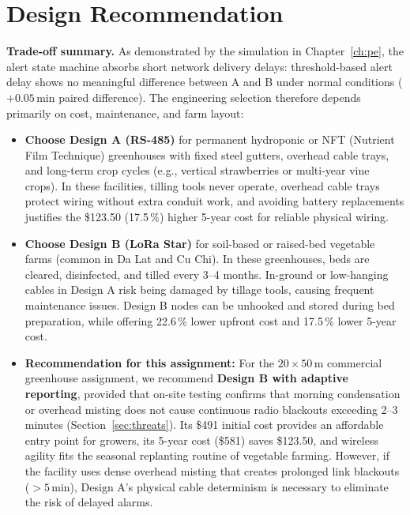 \documentclass[11pt,a4paper]{report}
\begin{document}
\section{Design Recommendation}\label{sec:rec}
\textbf{Trade-off summary.} As demonstrated by the simulation in Chapter~\ref{ch:pe}, the alert state machine absorbs short network delivery delays: threshold-based alert delay shows no meaningful difference between A and B under normal conditions ($+0.05$\,min paired difference). The engineering selection therefore depends primarily on cost, maintenance, and farm layout:
\begin{itemize}
  \item \textbf{Choose Design A (RS-485)} for permanent hydroponic or NFT (Nutrient Film Technique) greenhouses with fixed steel gutters, overhead cable trays, and long-term crop cycles (e.g., vertical strawberries or multi-year vine crops). In these facilities, tilling tools never operate, overhead cable trays protect wiring without extra conduit work, and avoiding battery replacements justifies the \$123.50 (17.5\,\%) higher 5-year cost for reliable physical wiring.
  \item \textbf{Choose Design B (LoRa Star)} for soil-based or raised-bed vegetable farms (common in Da Lat and Cu Chi). In these greenhouses, beds are cleared, disinfected, and tilled every 3--4 months. In-ground or low-hanging cables in Design A risk being damaged by tillage tools, causing frequent maintenance issues. Design B nodes can be unhooked and stored during bed preparation, while offering 22.6\,\% lower upfront cost and 17.5\,\% lower 5-year cost.
  \item \textbf{Recommendation for this assignment:} For the $20\times50$\,m commercial greenhouse assignment, we recommend \textbf{Design B with adaptive reporting}, provided that on-site testing confirms that morning condensation or overhead misting does not cause continuous radio blackouts exceeding 2--3 minutes (Section~\ref{sec:threats}). Its \$491 initial cost provides an affordable entry point for growers, its 5-year cost (\$581) saves \$123.50, and wireless agility fits the seasonal replanting routine of vegetable farming. However, if the facility uses dense overhead misting that creates prolonged link blackouts ($>5$\,min), Design A's physical cable determinism is necessary to eliminate the risk of delayed alarms.
\end{itemize}

\end{document}
